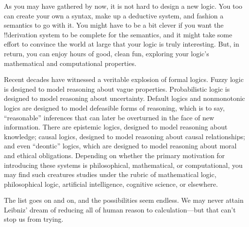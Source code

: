 \documentclass[../../../include/open-logic-section]{subfiles}
\begin{document}

As you may have gathered by now, it is not hard to design a new logic.
You too can create your own a syntax, make up a deductive system, and
fashion a semantics to go with it. You might have to be a bit clever
if you want the !!{derivation} system to be complete for the semantics, and it
might take some effort to convince the world at large that your logic
is truly interesting. But, in return, you can enjoy hours of good,
clean fun, exploring your logic's mathematical and computational
properties.

Recent decades have witnessed a veritable explosion of formal logics.
Fuzzy logic is designed to model reasoning about vague
properties. Probabilistic logic is designed to model
reasoning about uncertainty. Default logics and nonmonotonic logics
are designed to model defeasible forms of reasoning, which is
to say, ``reasonable'' inferences that can later be overturned in the
face of new information. There are epistemic logics, designed to
model reasoning about knowledge; causal logics, designed to
model reasoning about causal relationships; and even
``deontic'' logics, which are designed to model reasoning
about moral and ethical obligations. Depending on whether the primary
motivation for introducing these systems is philosophical,
mathematical, or computational, you may find such creatures studies
under the rubric of mathematical logic, philosophical logic,
artificial intelligence, cognitive science, or elsewhere.

The list goes on and on, and the possibilities seem endless. We
may never attain Leibniz' dream of reducing all of human reason to
calculation---but that can't stop us from trying.
\end{document}
